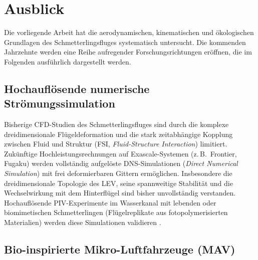 ﻿\documentclass[a4paper,12pt]{article}
\theoremstyle{definition}
\begin{document}
	\section{Ausblick}
	\label{sec:ausblick}
	
	Die vorliegende Arbeit hat die aerodynamischen, kinematischen und ökologischen
	Grundlagen des Schmetterlingsfluges systematisch untersucht.
	Die kommenden Jahrzehnte werden eine Reihe aufregender Forschungsrichtungen eröffnen,
	die im Folgenden ausführlich dargestellt werden.
	
	\subsection{Hochauflösende numerische Strömungssimulation}
	
	Bisherige CFD-Studien des Schmetterlingsfluges sind durch die komplexe
	dreidimensionale Flügeldeformation und die stark zeitabhängige Kopplung zwischen
	Fluid und Struktur (FSI, \textit{Fluid-Structure Interaction}) limitiert.
	Zukünftige Hochleistungsrechnungen auf Exascale-Systemen
	(z.\,B.\ Frontier, Fugaku) werden vollständig aufgelöste DNS-Simulationen
	(\textit{Direct Numerical Simulation}) mit frei deformierbaren Gittern ermöglichen.
	Insbesondere die dreidimensionale Topologie des LEV, seine spannweitige Stabilität
	und die Wechselwirkung mit dem Hinterflügel sind bisher unvollständig verstanden.
	Hochauflösende PIV-Experimente im Wasserkanal mit lebenden oder
	biomimetischen Schmetterlingen (Flügelreplikate aus fotopolymerisierten
	Materialien) werden diese Simulationen validieren \cite{bomphrey2017smart}.
	
	\subsection{Bio-inspirierte Mikro-Luftfahrzeuge (MAV)}
	
\end{document}

